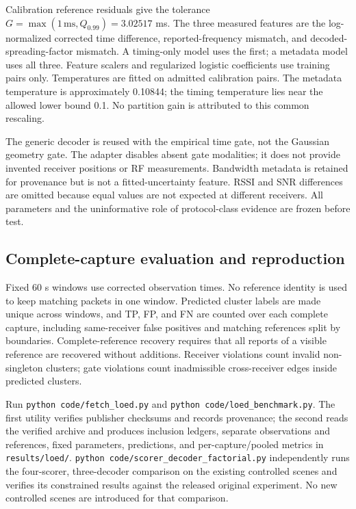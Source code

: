 \documentclass[10pt,a4paper]{article}
\begin{document}
Calibration reference residuals give the tolerance $G=\max(1\,\mathrm{ms},Q_{0.99})=3.02517$ ms. The three measured features are the log-normalized corrected time difference, reported-frequency mismatch, and decoded-spreading-factor mismatch. A timing-only model uses the first; a metadata model uses all three. Feature scalers and regularized logistic coefficients use training pairs only. Temperatures are fitted on admitted calibration pairs. The metadata temperature is approximately 0.10844; the timing temperature lies near the allowed lower bound 0.1. No partition gain is attributed to this common rescaling.

The generic decoder is reused with the empirical time gate, not the Gaussian geometry gate. The adapter disables absent gate modalities; it does not provide invented receiver positions or RF measurements. Bandwidth metadata is retained for provenance but is not a fitted-uncertainty feature. RSSI and SNR differences are omitted because equal values are not expected at different receivers. All parameters and the uninformative role of protocol-class evidence are frozen before test.

\subsection{Complete-capture evaluation and reproduction}
Fixed 60 s windows use corrected observation times. No reference identity is used to keep matching packets in one window. Predicted cluster labels are made unique across windows, and TP, FP, and FN are counted over each complete capture, including same-receiver false positives and matching references split by boundaries. Complete-reference recovery requires that all reports of a visible reference are recovered without additions. Receiver violations count invalid non-singleton clusters; gate violations count inadmissible cross-receiver edges inside predicted clusters.

Run \texttt{python code/fetch\_loed.py} and \texttt{python code/loed\_benchmark.py}. The first utility verifies publisher checksums and records provenance; the second reads the verified archive and produces inclusion ledgers, separate observations and references, fixed parameters, predictions, and per-capture/pooled metrics in \texttt{results/loed/}. \texttt{python code/scorer\_decoder\_factorial.py} independently runs the four-scorer, three-decoder comparison on the existing controlled scenes and verifies its constrained results against the released original experiment. No new controlled scenes are introduced for that comparison.
\end{document}
